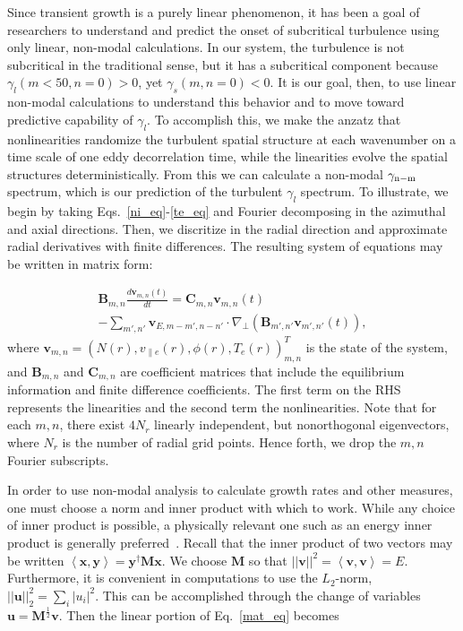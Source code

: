 \documentclass[letter,scriptaddress,twocolumn, prl,showkeys]{revtex4}
\def\beqar{\begin{eqnarray}}
\def\eeqar{\end{eqnarray}}
\newcommand{\diff}[2]{\frac{d#1}{d#2}}
\def\grad{\nabla}
\newcommand{\gradperp}{\grad_\perp}
\newcommand{\vpe}{v_{\parallel e}}
\begin{document}
Since transient growth is a purely linear phenomenon, it has been a goal of researchers to understand and predict the onset of subcritical turbulence using only linear, non-modal calculations. 
In our system, the turbulence is not subcritical in the traditional sense, but it has a subcritical component because $\gamma_l(m<50,n=0) > 0$, yet $\gamma_s(m,n=0) < 0$. 
It is our goal, then, to use linear non-modal calculations to understand this behavior and to move toward predictive capability of $\gamma_l$.
To accomplish this, we make the anzatz that nonlinearities randomize the turbulent spatial structure at each wavenumber on a time scale of 
one eddy decorrelation time, while the linearities evolve the spatial structures deterministically. From this we can calculate a non-modal $\gamma_{\rm{n-m}}$ spectrum,
which is our prediction of the turbulent $\gamma_l$ spectrum. To illustrate,
we begin by taking Eqs.~\ref{ni_eq}-\ref{te_eq} and Fourier decomposing in the azimuthal and axial directions.  Then, we discritize in the radial direction and
approximate radial derivatives with finite differences.  The resulting system of equations may be written in matrix form:

\beqar
\label{mat_eq}
\mathbf{B}_{m,n} \diff{\mathbf{v}_{m,n}(t)}{t} = \mathbf{C}_{m,n} \mathbf{v}_{m,n}(t) \nonumber \\
- \sum_{m',n'}  \mathbf{v}_{E,m-m',n-n'} \cdot \gradperp \left( \mathbf{B}_{m',n'} \mathbf{v}_{m',n'}(t) \right),
\eeqar
where $\mathbf{v}_{m,n} = \left( N(r), \vpe(r), \phi(r), T_e(r) \right)_{m,n}^{T}$ is the state of the system,
and $\mathbf{B}_{m,n}$ and $\mathbf{C}_{m,n}$ are coefficient matrices that include the equilibrium information and finite difference coefficients. The first term on the RHS represents the linearities
and the second term the nonlinearities. Note that for each $m,n$, there exist $4 N_r$ linearly independent, but nonorthogonal eigenvectors, where $N_r$ is the number of radial grid points. 
Hence forth, we drop the $m,n$ Fourier subscripts.

In order to use non-modal analysis to calculate growth rates and other measures, one must choose a norm and inner product with which to work. While any choice of
inner product is possible, a physically relevant one such as an energy inner product is generally preferred~\cite{camargo1998,schmid2007,camporeale2010}. 
Recall that the inner product of two vectors may be written $\left< \mathbf{x},\mathbf{y} \right> = \mathbf{y}^{\dagger} \mathbf{M} \mathbf{x}$.
We choose $\mathbf{M}$ so that $||\mathbf{v}||^2 = \left< \mathbf{v},\mathbf{v} \right> = E$. Furthermore, it is convenient in
computations to use the $L_2$-norm, $||\mathbf{u}||_2^2 = \sum_i |u_i|^2$. This can be accomplished through the change of variables $\mathbf{u} = \mathbf{M}^{\frac{1}{2}} \mathbf{v}$.
Then the linear portion of Eq.~\ref{mat_eq} becomes
\end{document}

